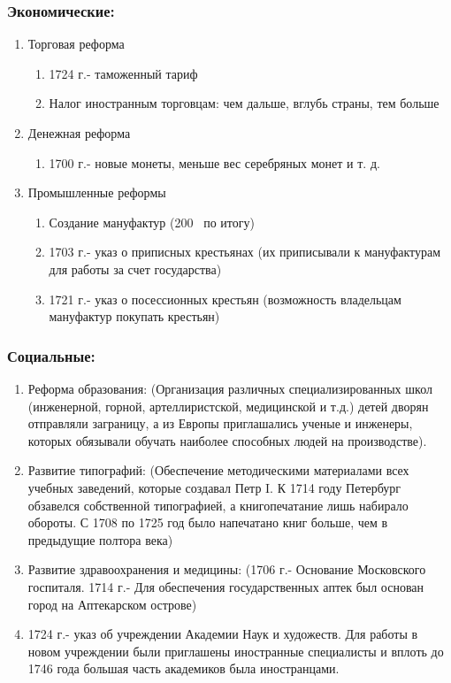\subsubsection{Экономические:}

\begin{enumerate}
    \item{ Торговая реформа
        \begin{enumerate}
            \item{ 1724 г.- таможенный тариф }
            \item{ Налог иностранным торговцам: чем дальше, вглубь страны, тем больше }
        \end{enumerate}
    }
    \item { Денежная реформа
        \begin{enumerate}
            \item{ 1700 г.- новые монеты, меньше вес серебряных монет и т. д. }
        \end{enumerate}
    }
    \item {Промышленные реформы
        \begin{enumerate}
            \item{ Создание мануфактур (200~ по итогу) }
            \item{ 1703 г.- указ о приписных крестьянах (их приписывали к мануфактурам для работы за счет государства)}
            \item{ 1721 г.- указ о посессионных крестьян (возможность владельцам мануфактур покупать крестьян)}
        \end{enumerate}
    }
\end{enumerate}

\subsubsection{Социальные:}

\begin{enumerate}
    \item{ Реформа образования: (Организация различных специализированных школ (инженерной, горной, артеллиристской, медицинской и т.д.) детей дворян отправляли заграницу, а из Европы приглашались ученые и инженеры, которых обязывали обучать наиболее способных людей на производстве).}
    \item{ Развитие типографий: (Обеспечение методическими материалами всех учебных заведений, которые создавал Петр I. К 1714 году Петербург обзавелся собственной типографией, а книгопечатание лишь набирало обороты. С 1708 по 1725 год было напечатано книг больше, чем в предыдущие полтора века)}
    \item{ Развитие здравоохранения и медицины: (1706 г.- Основание Московского госпиталя. 1714 г.- Для обеспечения государственных аптек был основан город на Аптекарском острове)}
    \item{ 1724 г.- указ об учреждении Академии Наук и художеств. Для работы в новом учреждении были приглашены иностранные специалисты и вплоть до 1746 года большая часть академиков была иностранцами.}
\end{enumerate}


